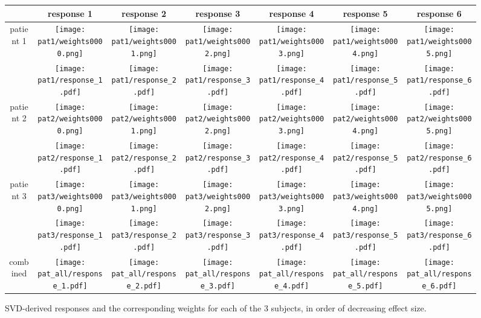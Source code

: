 \documentclass{article}
\begin{document}
\begin{figure}[htbp]
\begin{tabular}{*{7}{c}}
\toprule
& response 1 & response 2 & response 3 & response 4 & response 5 & response 6 \\
\midrule

\multirow{2}{*}{patient 1} & 
\texttt{[image: pat1/weights0000.png]} &
\texttt{[image: pat1/weights0001.png]} &
\texttt{[image: pat1/weights0002.png]} &
\texttt{[image: pat1/weights0003.png]} &
\texttt{[image: pat1/weights0004.png]} &
\texttt{[image: pat1/weights0005.png]} \\
& 
\texttt{[image: pat1/response\_1.pdf]} &
\texttt{[image: pat1/response\_2.pdf]} &
\texttt{[image: pat1/response\_3.pdf]} &
\texttt{[image: pat1/response\_4.pdf]} &
\texttt{[image: pat1/response\_5.pdf]} &
\texttt{[image: pat1/response\_6.pdf]} \\

\multirow{2}{*}{patient 2} & 
\texttt{[image: pat2/weights0000.png]} &
\texttt{[image: pat2/weights0001.png]} &
\texttt{[image: pat2/weights0002.png]} &
\texttt{[image: pat2/weights0003.png]} &
\texttt{[image: pat2/weights0004.png]} &
\texttt{[image: pat2/weights0005.png]} \\
& 
\texttt{[image: pat2/response\_1.pdf]} &
\texttt{[image: pat2/response\_2.pdf]} &
\texttt{[image: pat2/response\_3.pdf]} &
\texttt{[image: pat2/response\_4.pdf]} &
\texttt{[image: pat2/response\_5.pdf]} &
\texttt{[image: pat2/response\_6.pdf]} \\


\multirow{2}{*}{patient 3} & 
\texttt{[image: pat3/weights0000.png]} &
\texttt{[image: pat3/weights0001.png]} &
\texttt{[image: pat3/weights0002.png]} &
\texttt{[image: pat3/weights0003.png]} &
\texttt{[image: pat3/weights0004.png]} &
\texttt{[image: pat3/weights0005.png]} \\
& 
\texttt{[image: pat3/response\_1.pdf]} &
\texttt{[image: pat3/response\_2.pdf]} &
\texttt{[image: pat3/response\_3.pdf]} &
\texttt{[image: pat3/response\_4.pdf]} &
\texttt{[image: pat3/response\_5.pdf]} &
\texttt{[image: pat3/response\_6.pdf]} \\

\midrule

\multirow{1}{*}{combined} & 
\texttt{[image: pat\_all/response\_1.pdf]} &
\texttt{[image: pat\_all/response\_2.pdf]} &
\texttt{[image: pat\_all/response\_3.pdf]} &
\texttt{[image: pat\_all/response\_4.pdf]} &
\texttt{[image: pat\_all/response\_5.pdf]} &
\texttt{[image: pat\_all/response\_6.pdf]} \\

\bottomrule
\end{tabular}
\caption{SVD-derived responses and the corresponding weights for each of the 3 subjects,
 in order of decreasing effect size.}
\end{figure}
\end{document}
